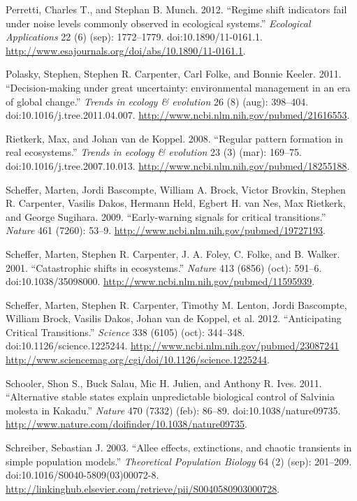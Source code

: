 \documentclass[author-year, review]{elsarticle} %
\begin{document}
Perretti, Charles T., and Stephan B. Munch. 2012. ``Regime shift
indicators fail under noise levels commonly observed in ecological
systems.'' \emph{Ecological Applications} 22 (6) (sep): 1772--1779.
doi:10.1890/11-0161.1.
\url{http://www.esajournals.org/doi/abs/10.1890/11-0161.1}.

Polasky, Stephen, Stephen R. Carpenter, Carl Folke, and Bonnie Keeler.
2011. ``Decision-making under great uncertainty: environmental
management in an era of global change.'' \emph{Trends in ecology \&
evolution} 26 (8) (aug): 398--404. doi:10.1016/j.tree.2011.04.007.
\url{http://www.ncbi.nlm.nih.gov/pubmed/21616553}.

Rietkerk, Max, and Johan van de Koppel. 2008. ``Regular pattern
formation in real ecosystems.'' \emph{Trends in ecology \& evolution} 23
(3) (mar): 169--75. doi:10.1016/j.tree.2007.10.013.
\url{http://www.ncbi.nlm.nih.gov/pubmed/18255188}.

Scheffer, Marten, Jordi Bascompte, William A. Brock, Victor Brovkin,
Stephen R. Carpenter, Vasilis Dakos, Hermann Held, Egbert H. van Nes,
Max Rietkerk, and George Sugihara. 2009. ``Early-warning signals for
critical transitions.'' \emph{Nature} 461 (7260): 53--9.
\url{http://www.ncbi.nlm.nih.gov/pubmed/19727193}.

Scheffer, Marten, Stephen R. Carpenter, J. A. Foley, C. Folke, and B.
Walker. 2001. ``Catastrophic shifts in ecosystems.'' \emph{Nature} 413
(6856) (oct): 591--6. doi:10.1038/35098000.
\url{http://www.ncbi.nlm.nih.gov/pubmed/11595939}.

Scheffer, Marten, Stephen R. Carpenter, Timothy M. Lenton, Jordi
Bascompte, William Brock, Vasilis Dakos, Johan van de Koppel, et al.
2012. ``Anticipating Critical Transitions.'' \emph{Science} 338 (6105)
(oct): 344--348. doi:10.1126/science.1225244.
\href{http://www.ncbi.nlm.nih.gov/pubmed/23087241 http://www.sciencemag.org/cgi/doi/10.1126/science.1225244}{http://www.ncbi.nlm.nih.gov/pubmed/23087241
http://www.sciencemag.org/cgi/doi/10.1126/science.1225244}.

Schooler, Shon S., Buck Salau, Mic H. Julien, and Anthony R. Ives. 2011.
``Alternative stable states explain unpredictable biological control of
Salvinia molesta in Kakadu.'' \emph{Nature} 470 (7332) (feb): 86--89.
doi:10.1038/nature09735.
\url{http://www.nature.com/doifinder/10.1038/nature09735}.

Schreiber, Sebastian J. 2003. ``Allee effects, extinctions, and chaotic
transients in simple population models.'' \emph{Theoretical Population
Biology} 64 (2) (sep): 201--209. doi:10.1016/S0040-5809(03)00072-8.
\url{http://linkinghub.elsevier.com/retrieve/pii/S0040580903000728}.
\end{document}
